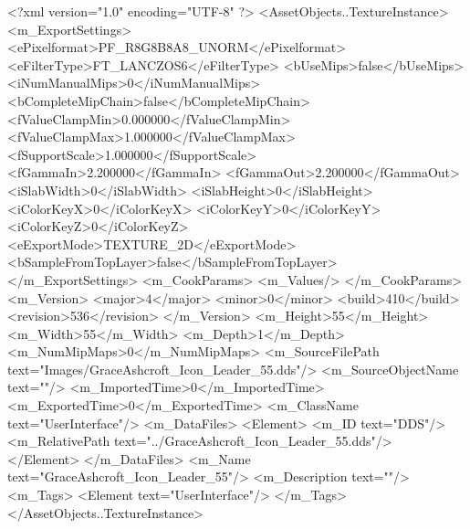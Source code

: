 <?xml version="1.0" encoding="UTF-8" ?>
<AssetObjects..TextureInstance>
	<m_ExportSettings>
		<ePixelformat>PF_R8G8B8A8_UNORM</ePixelformat>
		<eFilterType>FT_LANCZOS6</eFilterType>
		<bUseMips>false</bUseMips>
		<iNumManualMips>0</iNumManualMips>
		<bCompleteMipChain>false</bCompleteMipChain>
		<fValueClampMin>0.000000</fValueClampMin>
		<fValueClampMax>1.000000</fValueClampMax>
		<fSupportScale>1.000000</fSupportScale>
		<fGammaIn>2.200000</fGammaIn>
		<fGammaOut>2.200000</fGammaOut>
		<iSlabWidth>0</iSlabWidth>
		<iSlabHeight>0</iSlabHeight>
		<iColorKeyX>0</iColorKeyX>
		<iColorKeyY>0</iColorKeyY>
		<iColorKeyZ>0</iColorKeyZ>
		<eExportMode>TEXTURE_2D</eExportMode>
		<bSampleFromTopLayer>false</bSampleFromTopLayer>
	</m_ExportSettings>
	<m_CookParams>
		<m_Values/>
	</m_CookParams>
	<m_Version>
		<major>4</major>
		<minor>0</minor>
		<build>410</build>
		<revision>536</revision>
	</m_Version>
	<m_Height>55</m_Height>
	<m_Width>55</m_Width>
	<m_Depth>1</m_Depth>
	<m_NumMipMaps>0</m_NumMipMaps>
	<m_SourceFilePath text="Images/GraceAshcroft_Icon_Leader_55.dds"/>
	<m_SourceObjectName text=""/>
	<m_ImportedTime>0</m_ImportedTime>
	<m_ExportedTime>0</m_ExportedTime>
	<m_ClassName text="UserInterface"/>
	<m_DataFiles>
		<Element>
			<m_ID text="DDS"/>
			<m_RelativePath text="../GraceAshcroft_Icon_Leader_55.dds"/>
		</Element>
	</m_DataFiles>
	<m_Name text="GraceAshcroft_Icon_Leader_55"/>
	<m_Description text=""/>
	<m_Tags>
		<Element text="UserInterface"/>
	</m_Tags>
</AssetObjects..TextureInstance>
